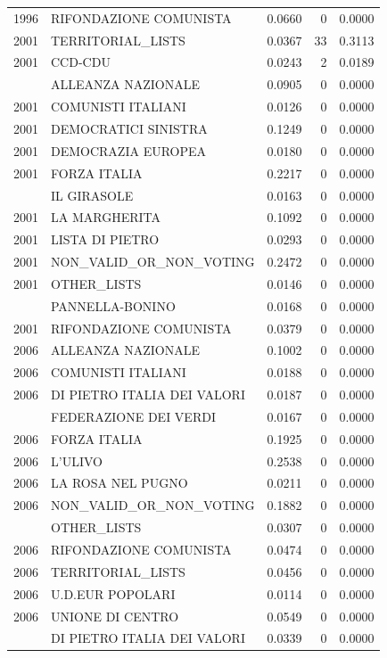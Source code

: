 \begin{longtable}[t]{rlrrr}
1996 & RIFONDAZIONE COMUNISTA & 0.0660 & 0 & 0.0000\\
2001 & TERRITORIAL\_LISTS & 0.0367 & 33 & 0.3113\\
2001 & CCD-CDU & 0.0243 & 2 & 0.0189\\
\addlinespace
2001 & ALLEANZA NAZIONALE & 0.0905 & 0 & 0.0000\\
2001 & COMUNISTI ITALIANI & 0.0126 & 0 & 0.0000\\
2001 & DEMOCRATICI SINISTRA & 0.1249 & 0 & 0.0000\\
2001 & DEMOCRAZIA EUROPEA & 0.0180 & 0 & 0.0000\\
2001 & FORZA ITALIA & 0.2217 & 0 & 0.0000\\
\addlinespace
2001 & IL GIRASOLE & 0.0163 & 0 & 0.0000\\
2001 & LA MARGHERITA & 0.1092 & 0 & 0.0000\\
2001 & LISTA DI PIETRO & 0.0293 & 0 & 0.0000\\
2001 & NON\_VALID\_OR\_NON\_VOTING & 0.2472 & 0 & 0.0000\\
2001 & OTHER\_LISTS & 0.0146 & 0 & 0.0000\\
\addlinespace
2001 & PANNELLA-BONINO & 0.0168 & 0 & 0.0000\\
2001 & RIFONDAZIONE COMUNISTA & 0.0379 & 0 & 0.0000\\
2006 & ALLEANZA NAZIONALE & 0.1002 & 0 & 0.0000\\
2006 & COMUNISTI ITALIANI & 0.0188 & 0 & 0.0000\\
2006 & DI PIETRO ITALIA DEI VALORI & 0.0187 & 0 & 0.0000\\
\addlinespace
2006 & FEDERAZIONE DEI VERDI & 0.0167 & 0 & 0.0000\\
2006 & FORZA ITALIA & 0.1925 & 0 & 0.0000\\
2006 & L'ULIVO & 0.2538 & 0 & 0.0000\\
2006 & LA ROSA NEL PUGNO & 0.0211 & 0 & 0.0000\\
2006 & NON\_VALID\_OR\_NON\_VOTING & 0.1882 & 0 & 0.0000\\
\addlinespace
2006 & OTHER\_LISTS & 0.0307 & 0 & 0.0000\\
2006 & RIFONDAZIONE COMUNISTA & 0.0474 & 0 & 0.0000\\
2006 & TERRITORIAL\_LISTS & 0.0456 & 0 & 0.0000\\
2006 & U.D.EUR POPOLARI & 0.0114 & 0 & 0.0000\\
2006 & UNIONE DI CENTRO & 0.0549 & 0 & 0.0000\\
\addlinespace
2008 & DI PIETRO ITALIA DEI VALORI & 0.0339 & 0 & 0.0000\\

\end{longtable}

